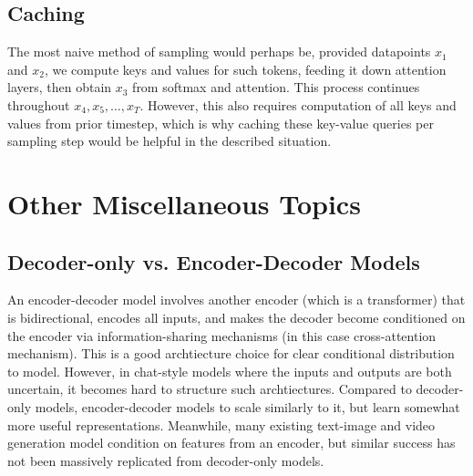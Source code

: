 \subsection{Caching}
The most naive method of sampling would perhaps be, provided datapoints $x_1$ and $x_2$, we compute keys and values for such tokens, feeding it down attention layers, then obtain $x_3$ from softmax and attention.
This process continues throughout $x_4, x_5, \dots, x_T$.
However, this also requires computation of all keys and values from prior timestep, which is why caching these key-value queries per sampling step would be helpful in the described situation.

\section{Other Miscellaneous Topics}
\subsection{Decoder-only vs. Encoder-Decoder Models}
An encoder-decoder model involves another encoder (which is a transformer) that is bidirectional, encodes all inputs, and makes the decoder become conditioned on the encoder via information-sharing mechanisms (in this case cross-attention mechanism).
This is a good archtiecture choice for clear conditional distribution to model.
However, in chat-style models where the inputs and outputs are both uncertain, it becomes hard to structure such archtiectures.
Compared to decoder-only models, encoder-decoder models to scale similarly to it, but learn somewhat more useful representations.
Meanwhile, many existing text-image and video generation model condition on features from an encoder, but similar success has not been massively replicated from decoder-only models.
